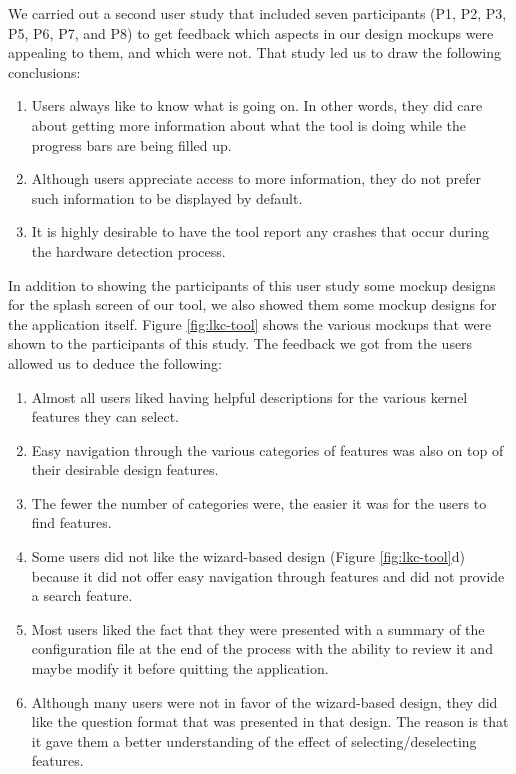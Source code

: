 \documentclass{chi2009}
\begin{document}
We carried out a second user study that included seven participants (P1, P2, P3, P5, P6, P7, and P8) to get feedback which aspects in our design mockups were
appealing to them, and which were not. That study led us to draw the following conclusions:
\begin{enumerate}
 \item Users always like to know what is going on. In other words, they did care about getting more information about what the tool is doing while the progress
bars are being filled up.
 \item Although users appreciate access to more information, they do not prefer such information to be displayed by default.
 \item It is highly desirable to have the tool report any crashes that occur during the hardware detection process.
\end{enumerate}

In addition to showing the participants of this user study some mockup designs for the splash screen of our tool, we also showed them some mockup designs
for the application itself. Figure \ref{fig:lkc-tool} shows the various mockups that were shown to the participants of this study. The feedback we got from the
users allowed us to deduce the following:
\begin{enumerate}
 \item Almost all users liked having helpful descriptions for the various kernel features they can select.
 \item Easy navigation through the various categories of features was also on top of their desirable design features.
 \item The fewer the number of categories were, the easier it was for the users to find features.
 \item Some users did not like the wizard-based design (Figure \ref{fig:lkc-tool}d) because it did not offer easy navigation through features and did not
provide a search feature.
 \item Most users liked the fact that they were presented with a summary of the configuration file at the end of the process with the ability to review it and
maybe modify it before quitting the application.
 \item Although many users were not in favor of the wizard-based design, they did like the question format that was presented in that design. The reason is
that it gave them a better understanding of the effect of selecting/deselecting features.
\end{enumerate}
\end{document}
